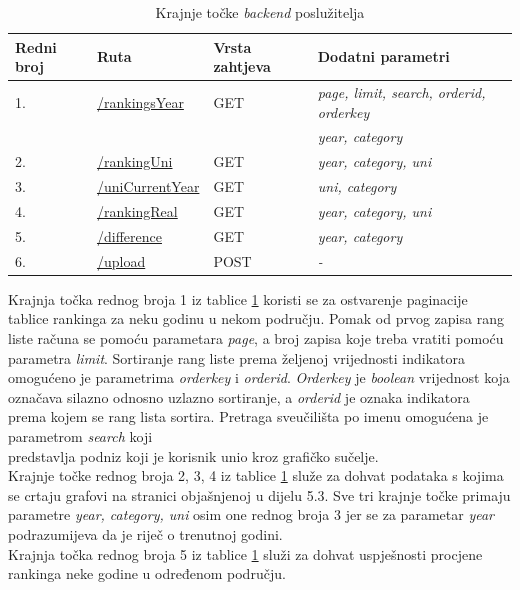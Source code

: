 \documentclass[times, utf8, zavrsni]{fer}
\begin{document}
\begin{table}[htb]
    \caption{Krajnje točke \emph{backend} poslužitelja}
        \label{tbl:endpoints}
        \centering
        \begin{tabular}{llll} \hline
        Redni broj & Ruta & Vrsta zahtjeva & Dodatni parametri\\ \hline
        1. & \url{/rankingsYear} & GET & \emph{page, limit, search, orderid, orderkey} \\
        &&&\emph{year, category}
        \\2. & \url{/rankingUni} & GET & \emph{year, category, uni}
        \\3. & \url{/uniCurrentYear} & GET & \emph{uni, category}
        \\4. & \url{/rankingReal} & GET & \emph{year, category, uni}
        \\5. & \url{/difference} & GET & \emph{ year, category}
        \\6. & \url{/upload} & POST & \emph{-}
        \end{tabular}
        \end{table} 
        \FloatBarrier
Krajnja točka rednog broja 1 iz tablice \ref{tbl:endpoints} koristi se za ostvarenje paginacije tablice rankinga za neku godinu u nekom području.
Pomak od prvog zapisa rang liste računa se pomoću parametara \emph{page}, a broj zapisa koje treba vratiti pomoću parametra \emph{limit}.
Sortiranje rang liste prema željenoj vrijednosti indikatora omogućeno je parametrima \emph{orderkey} i \emph{orderid}.
\emph{Orderkey} je \emph{boolean} vrijednost koja označava silazno odnosno uzlazno sortiranje, a \emph{orderid} je oznaka indikatora
prema kojem se rang lista sortira. Pretraga sveučilišta po imenu omogućena je parametrom \emph{search} koji \\predstavlja podniz koji je korisnik unio 
kroz grafičko sučelje.
\\

Krajnje točke rednog broja 2, 3, 4 iz tablice \ref{tbl:endpoints} služe za dohvat podataka s kojima se crtaju grafovi na stranici objašnjenoj u 
dijelu 5.3. Sve tri krajnje točke primaju parametre \emph{year, category, uni} osim one rednog broja 3 jer se za parametar \emph{year} podrazumijeva 
da je riječ o trenutnoj godini.
\\

Krajnja točka rednog broja 5 iz tablice \ref{tbl:endpoints} služi za dohvat uspješnosti procjene \\rankinga neke godine u određenom području.
\\
\end{document}
